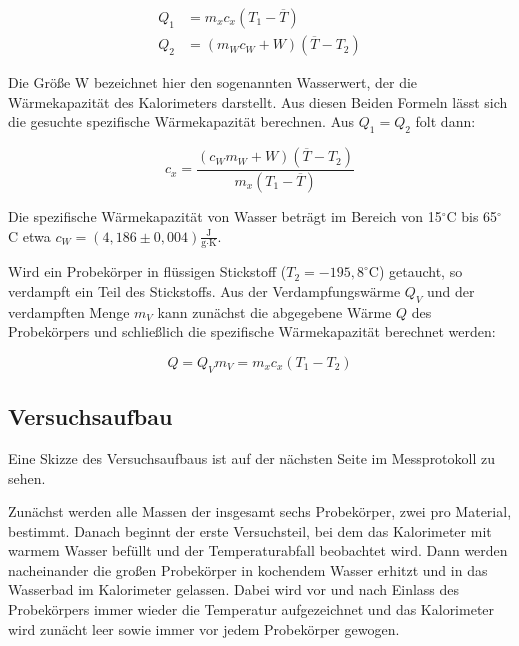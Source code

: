 \documentclass{article}
\begin{document}
\begin{equation}
    \begin{split}
        Q_1 &= m_x c_x (T_1 - \overline{T}) \\
        Q_2 &= (m_W c_W + W)(\overline{T} - T_2)
    \end{split}
\end{equation}

Die Größe W bezeichnet hier den sogenannten Wasserwert, der die Wärmekapazität des Kalorimeters darstellt. Aus diesen Beiden Formeln lässt sich die gesuchte spezifische Wärmekapazität berechnen. Aus $Q_1 = Q_2$ folt dann:

\begin{equation}
    c_x = \frac{(c_W m_W + W) (\overline{T} - T_2)}{m_x (T_1 - \overline{T})}
\end{equation}

Die spezifische Wärmekapazität von Wasser beträgt im Bereich von 15$^\circ$C bis 65$^\circ$C etwa $c_W = (4,186 \pm 0,004) \frac{\text{J}}{\text{g} \cdot \text{K}}$.

Wird ein Probekörper in flüssigen Stickstoff ($T_2 = -195,8^\circ$C) getaucht, so verdampft ein Teil des Stickstoffs. Aus der Verdampfungswärme $Q_V$ und der verdampften Menge $m_V$ kann zunächst die abgegebene Wärme $Q$ des Probekörpers und schließlich die spezifische Wärmekapazität berechnet werden:

\begin{equation}
    Q = Q_V m_V = m_x c_x (T_1 - T_2)
\end{equation}

\newpage

\subsection{Versuchsaufbau}

Eine Skizze des Versuchsaufbaus ist auf der nächsten Seite im Messprotokoll zu sehen. 

Zunächst werden alle Massen der insgesamt sechs Probekörper, zwei pro Material, bestimmt. Danach beginnt der erste Versuchsteil, bei dem das Kalorimeter mit warmem Wasser befüllt und der Temperaturabfall beobachtet wird. Dann werden nacheinander die großen Probekörper in kochendem Wasser erhitzt und in das Wasserbad im Kalorimeter gelassen. Dabei wird vor und nach Einlass des Probekörpers immer wieder die Temperatur aufgezeichnet und das Kalorimeter wird zunächt leer sowie immer vor jedem Probekörper gewogen.
\end{document}

